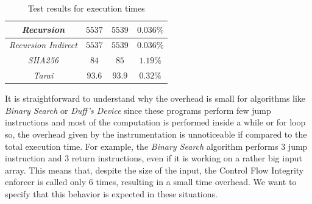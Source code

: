 \begin{table}
\begin{tabular}{|c|c|c|c|}
    \hline
    \textit{Recursion}                   & $5537$                        & $5539$                        & $0.036\%$              \\
    \hline
    \textit{Recursion Indirect}          & $5537$                        & $5539$                        & $0.036\%$              \\
    \hline
    \textit{SHA256}                      & $84$                          & $85$                          & $1.19\%$               \\
    \hline
    \textit{Tarai}                       & $93.6$                        & $93.9$                        & $0.32\%$               \\
    \hline
  \end{tabular}
  \caption{Test results for execution times}
  \label{tab:times}
\end{table}

It is straightforward to understand why the overhead is small for algorithms like
\textit{Binary Search} or \textit{Duff's Device} since these programs perform few
jump instructions and most of the computation is performed inside a while or for
loop so, the overhead given by the instrumentation is unnoticeable if compared
to the total execution time. For example, the \textit{Binary Search} algorithm performs
$3$ jump instruction and $3$ return instructions, even if it is working on a
rather big input array. This means that, despite the size of the input, the Control
Flow Integrity enforcer is called only $6$ times, resulting in a small time
overhead. We want to specify that this behavior is expected in these situations.

